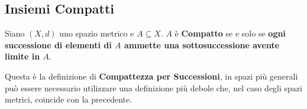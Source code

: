 \subsection{Insiemi Compatti}
\begin{definition}
	\label{def:compatto}
	Siano $(X,d)$ uno spazio metrico e $A \subseteq X$. $A$ è \textbf{Compatto} se e solo se \textbf{ogni successione di elementi di $A$ ammette una sottosuccessione avente limite in $A$}.
	\begin{note}
		Questa è la definizione di \textbf{Compattezza per Successioni}, in spazi più generali può essere necessario utilizzare una definizione più debole che, nel caso degli spazi metrici, coincide con la precedente.
	\end{note}
\end{definition}
